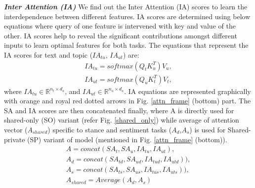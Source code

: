 \documentclass[letterpaper]{article} %
\begin{document}
\par \noindent \textbf{\textit{Inter Attention (IA)}} We find out the Inter Attention (IA) scores to learn the interdependence between different features. IA scores are determined using below equations where query of one feature is intervened with key and value of the other. IA scores help to reveal the significant contributions amongst different inputs to learn optimal features for both tasks. The equations that represent the IA scores for text and topic ($IA_{tu}$, $IA_{ut}$) are:
\begin{gather}
    IA_{tu} = softmax(Q_{t}K^T_{u})V_{u}, \label{ia_1} \\
    IA_{ut} = softmax(Q_{u}K^T_{t})V_{t}, \label{ia_2}
\end{gather}
where $IA_{tu} \in \mathbb{R}^{n_{t} \times d_a} $, and $IA_{ut} \in \mathbb{R}^{n_{u} \times d_a} $. IA equations are represented graphically with orange and royal red dotted arrows in Fig. \ref{attn_frame} (bottom) part. The SA and IA scores are then concatenated finally, where A is directly used for shared-only (SO) variant (refer Fig. \ref{shared_only}) while average of attention vector ($A_{shared}$) specific to stance and sentiment tasks ($A_d$,$A_s$) is used for Shared-private (SP) variant of model (mentioned in Fig. \ref{attn_frame} (bottom)). 
\begin{gather}
    A    = concat(SA_{t},SA_u, IA_{tu},IA_{ut}), \\
    A_{d} = concat(SA_{td},SA_{ud}, IA_{tud},IA_{utd})), \label{attn_pol}\\
    A_{s} = concat(SA_{ts},SA_{us}, IA_{tus},IA_{uts})),\\
    A_{shared} = Average(A_{d},A_{s}) \label{attn_sh}
\end{gather}
\end{document}
